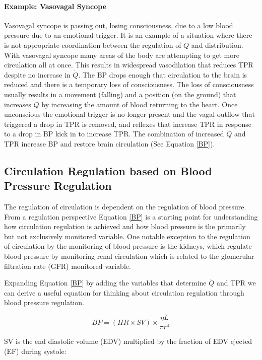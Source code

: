 \paragraph{Example: Vasovagal Syncope}
Vasovagal syncope is passing out, losing consciousness, due to a low blood pressure due to an emotional trigger. It is an example of a situation where there is not appropriate coordination between the regulation of $\dot{Q}$ and distribution. With vasovagal syncope many areas of the body are attempting to get more circulation all at once. This results in widespread vasodilation that reduces TPR despite no increase in $\dot{Q}$. The BP drops enough that circulation to the brain is reduced and there is a temporary loss of consciousness. The loss of consciousness usually results in a movement (falling) and a position (on the ground) that increases $\dot{Q}$ by increasing the amount of blood returning to the heart. Once unconscious the emotional trigger is no longer present and the vagal outflow that triggered a drop in TPR is removed, and reflexes that increase TPR in response to a drop in BP kick in to increase TPR. The combination of increased $\dot{Q}$ and TPR increase BP and restore brain circulation (See Equation \ref{BP}).

\subsection{Circulation Regulation based on Blood Pressure Regulation}

The regulation of circulation is dependent on the regulation of blood pressure. From a regulation perspective Equation \ref{BP} is a starting point for understanding how circulation regulation is achieved and how blood pressure is the primarily but not exclusively monitored variable. One notable exception to the regulation of circulation by the monitoring of blood pressure is the kidneys, which regulate blood pressure by monitoring renal circulation which is related to the glomerular filtration rate (GFR) monitored variable. 

Expanding Equation \ref{BP} by adding the variables that determine $\dot{Q}$ and TPR we can derive a useful equation for thinking about circulation regulation through blood pressure regulation.

\begin{equation}
    BP = (HR \times SV) \times \frac{\eta L}{\pi r^4}
\end{equation}

SV is the end diastolic volume (EDV) multiplied by the fraction of EDV ejected (EF) during systole:

